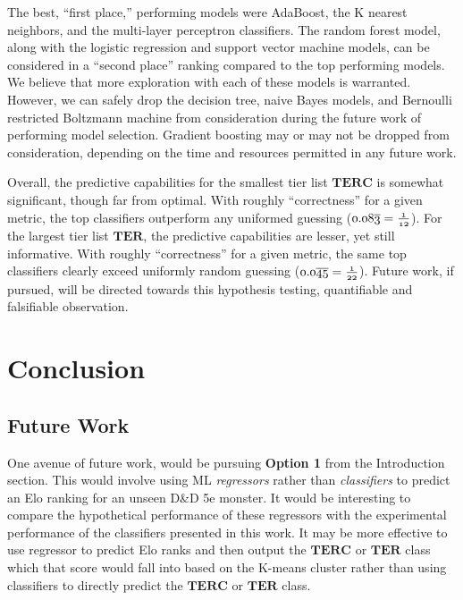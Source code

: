 \documentclass{article}
\newcommand{\Qty}[1]{\oldstylenums{#1}}
\newcommand{\TER}{\ensuremath{\mathbf{TER}}\xspace}
\newcommand{\TERC}{\ensuremath{\mathbf{TERC}}\xspace}
\newcommand{\DnD}{D\&D 5e\xspace}
\begin{document}
The best, ``first place,'' performing models were AdaBoost, the K nearest neighbors, and the multi-layer perceptron classifiers.
The random forest model, along with the logistic regression and support vector machine models, can be considered in a ``second place'' ranking compared to the top performing models.
We believe that more exploration with each of these \Qty{6} models is warranted.
However, we can safely drop the decision tree, naive Bayes models, and Bernoulli restricted Boltzmann machine from consideration during the future work of performing model selection.
Gradient boosting may or may not be dropped from consideration, depending on the time and resources permitted in any future work.

Overall, the predictive capabilities for the smallest tier list \TERC is somewhat significant, though far from optimal.
With roughly \Qty{0.48} ``correctness'' for a given metric, the top classifiers outperform any uniformed guessing ($\Qty{0.08\overline{3}} = \frac{\Qty{1}}{\Qty{12}}$).
For the largest tier list \TER, the predictive capabilities are lesser, yet still informative.
With roughly \Qty{0.29} ``correctness'' for a given metric, the same top classifiers clearly exceed uniformly random guessing ($\Qty{0.0\overline{45}} = \frac{\Qty{1}}{\Qty{22}}$).
Future work, if pursued, will be directed towards this hypothesis testing, quantifiable and falsifiable observation.


\hypertarget{conclusion}{%
\section{Conclusion}}


\hypertarget{future-work}{%
\subsection{Future Work}}

One avenue of future work, would be pursuing \textbf{Option 1} from the Introduction section.
This would involve using ML \emph{regressors} rather than \emph{classifiers} to predict an Elo ranking for an unseen \DnD monster.
It would be interesting to compare the hypothetical performance of these regressors with the experimental performance of the classifiers presented in this work.
It may be more effective to use regressor to predict Elo ranks and then output the \TERC or \TER class which that score would fall into based on the K-means cluster rather than using classifiers to directly predict the \TERC or \TER class.
\end{document}
